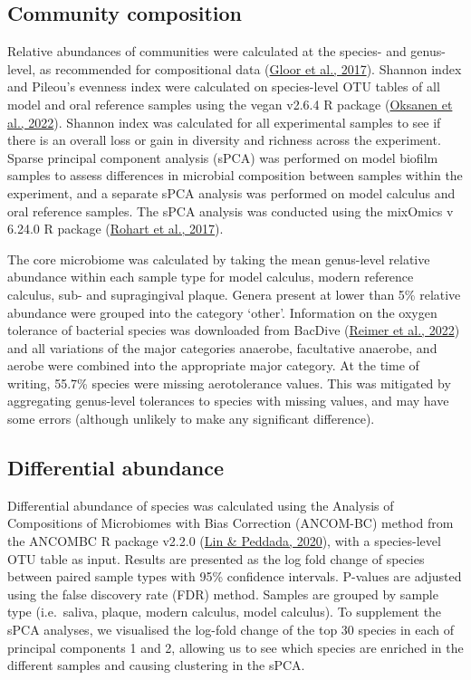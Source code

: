\documentclass[
  letterpaper,
]{book}
\begin{document}
\hypertarget{community-composition}{%
\subsection{Community composition}\label{community-composition}}

Relative abundances of communities were calculated at the species- and
genus-level, as recommended for compositional data
(\protect\hyperlink{ref-gloorMicrobiomeDatasets2017}{Gloor et al.,
2017}). Shannon index and Pileou's evenness index were calculated on
species-level OTU tables of all model and oral reference samples using
the vegan v2.6.4 R package (\protect\hyperlink{ref-Rvegan}{Oksanen et
al., 2022}). Shannon index was calculated for all experimental samples
to see if there is an overall loss or gain in diversity and richness
across the experiment. Sparse principal component analysis (sPCA) was
performed on model biofilm samples to assess differences in microbial
composition between samples within the experiment, and a separate sPCA
analysis was performed on model calculus and oral reference samples. The
sPCA analysis was conducted using the mixOmics v 6.24.0 R package
(\protect\hyperlink{ref-RmixOmics}{Rohart et al., 2017}).

The core microbiome was calculated by taking the mean genus-level
relative abundance within each sample type for model calculus, modern
reference calculus, sub- and supragingival plaque. Genera present at
lower than 5\% relative abundance were grouped into the category
`other'. Information on the oxygen tolerance of bacterial species was
downloaded from BacDive
(\protect\hyperlink{ref-reimerBacDive2022}{Reimer et al., 2022}) and all
variations of the major categories anaerobe, facultative anaerobe, and
aerobe were combined into the appropriate major category. At the time of
writing, 55.7\% species were missing aerotolerance values. This was
mitigated by aggregating genus-level tolerances to species with missing
values, and may have some errors (although unlikely to make any
significant difference).

\hypertarget{differential-abundance}{%
\subsection{Differential abundance}\label{differential-abundance}}

Differential abundance of species was calculated using the Analysis of
Compositions of Microbiomes with Bias Correction (ANCOM-BC) method from
the ANCOMBC R package v2.2.0 (\protect\hyperlink{ref-linANCOMBC2020}{Lin
\& Peddada, 2020}), with a species-level OTU table as input. Results are
presented as the log fold change of species between paired sample types
with 95\% confidence intervals. P-values are adjusted using the false
discovery rate (FDR) method. Samples are grouped by sample type
(i.e.~saliva, plaque, modern calculus, model calculus). To supplement
the sPCA analyses, we visualised the log-fold change of the top 30
species in each of principal components 1 and 2, allowing us to see
which species are enriched in the different samples and causing
clustering in the sPCA.
\end{document}
